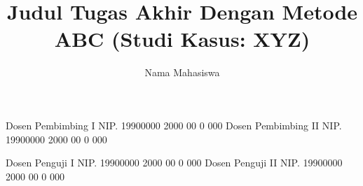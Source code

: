 \documentclass[article]{report} %
\begin{document}

    
    \title{Judul Tugas Akhir Dengan Metode ABC (Studi Kasus: XYZ)}
    
    \author{Nama Mahasiswa}		%
	
	\dosbingA%
		{Dosen Pembimbing I}%
		{NIP. 19900000 2000 00 0 000}	%
	\dosbingB%
		{Dosen Pembimbing II}%
		{NIP. 19900000 2000 00 0 000}	%
		
	\pengujiA%
		{Dosen Penguji I}%
		{NIP. 19900000 2000 00 0 000}	%
	\pengujiB%
		{Dosen Penguji II}%
		{NIP. 19900000 2000 00 0 000}	%

	\sloppy %
    \setcounter{page}{1} %
\end{document}
